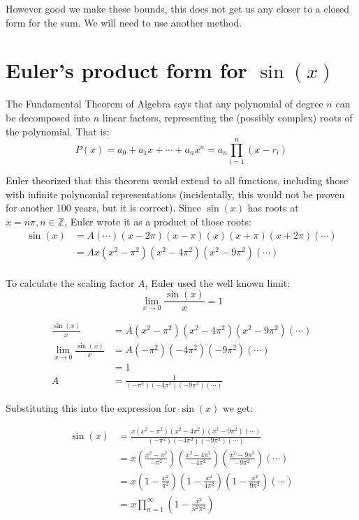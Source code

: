 \documentclass{article}
\begin{document}
However good we make these bounds, this does not get us any closer to a closed form for the sum. We will need to use another method.

\section{Euler's product form for $\sin(x)$}

The Fundamental Theorem of Algebra says that any polynomial of degree $n$ can be decomposed into $n$ linear factors, representing the (possibly complex) roots of the polynomial. That is:
\[ P(x) = a_0 + a_1x + \cdots + a_nx^n = a_n\prod_{i=1}^{n}(x-r_i) \]

Euler theorized that this theorem would extend to all functions, including those with infinite polynomial representations (incidentally, this would not be proven for another 100 years, but it is correct). Since $\sin(x)$ has roots at $x=n\pi, n \in \mathbb{Z}$, Euler wrote it as a product of those roots:
\begin{align*}
    \sin(x) &= A(\cdots)(x-2\pi)(x-\pi)(x)(x+\pi)(x+2\pi)(\cdots) \\
    &= Ax(x^2-\pi^2)(x^2-4\pi^2)(x^2-9\pi^2)(\cdots) \\
\end{align*}

To calculate the scaling factor $A$, Euler used the well known limit:
\[ \lim_{x\to 0} \frac{\sin(x)}{x} = 1 \]

\begin{align*}
    \frac{\sin(x)}{x} &= A(x^2-\pi^2)(x^2-4\pi^2)(x^2-9\pi^2)(\cdots) \\
    \lim_{x\to 0} \frac{\sin(x)}{x} &= A(-\pi^2)(-4\pi^2)(-9\pi^2)(\cdots) \\
    &= 1 \\
    A &= \frac{1}{(-\pi^2)(-4\pi^2)(-9\pi^2)(\cdots)}
\end{align*}

Substituting this into the expression for $\sin(x)$ we get:

\begin{align*}
     \sin(x) &= \frac{x(x^2-\pi^2)(x^2-4\pi^2)(x^2-9\pi^2)(\cdots)}{(-\pi^2)(-4\pi^2)(-9\pi^2)(\cdots)} \\
     &= x \left(\frac{x^2-\pi^2}{-\pi^2}\right)\left(\frac{x^2-4\pi^2}{-4\pi^2}\right)\left(\frac{x^2-9\pi^2}{-9\pi^2}\right) \left(\cdots\right)\\
     &= x\left(1-\frac{x^2}{\pi^2}\right)\left(1-\frac{x^2}{4\pi^2}\right)\left(1-\frac{x^2}{9\pi^2}\right)\left(\cdots\right) \\
     &= x\prod_{n=1}^{\infty} \left(1-\frac{x^2}{n^2\pi^2}\right)
\end{align*}
\end{document}
